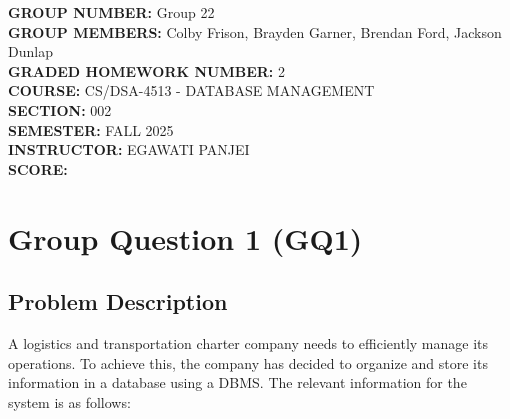 \documentclass[12pt]{article}
\begin{document}
\begin{titlepage}
\thispagestyle{empty}
\centering
\vspace*{2cm}

\begin{flushleft}
{\Large \textbf{GROUP NUMBER:} Group 22}\\[0.5cm]
{\Large \textbf{GROUP MEMBERS:} Colby Frison, Brayden Garner, Brendan Ford, Jackson Dunlap}\\[0.5cm]
{\Large \textbf{GRADED HOMEWORK NUMBER:} 2}\\[0.5cm]
{\Large \textbf{COURSE:} CS/DSA-4513 - DATABASE MANAGEMENT}\\[0.5cm]
{\Large \textbf{SECTION:} 002}\\[0.5cm]
{\Large \textbf{SEMESTER:} FALL 2025}\\[0.5cm]
{\Large \textbf{INSTRUCTOR:} EGAWATI PANJEI}\\[0.5cm]
{\Large \textbf{SCORE:} }\\[2cm]
\end{flushleft}


\vfill

\end{titlepage}

\tableofcontents
\newpage

\section{Group Question 1 (GQ1)}
\subsection{Problem Description}

A logistics and transportation charter company needs to efficiently manage its operations. To achieve this, the company has decided to organize and store its information in a database using a DBMS. The relevant information for the system is as follows:
\end{document}
